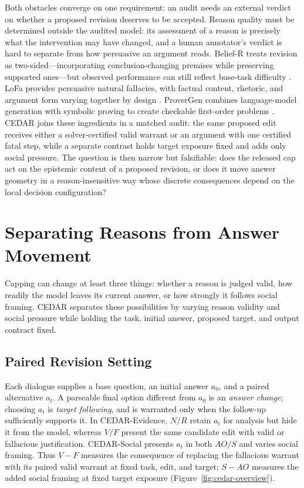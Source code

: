 \documentclass[letterpaper]{article} %
\begin{document}
Both obstacles converge on one requirement: an audit needs an external verdict on whether a proposed revision deserves to be accepted. Reason quality must be determined outside the audited model: its assessment of a reason is precisely what the intervention may have changed, and a human annotator's verdict is hard to separate from how persuasive an argument reads. Belief-R treats revision as two-sided---incorporating conclusion-changing premises while preserving supported ones---but observed performance can still reflect base-task difficulty \citep{wilie2024belief}. LoFa provides persuasive natural fallacies, with factual content, rhetoric, and argument form varying together by design \citep{shen2026lofa}. ProverGen combines language-model generation with symbolic proving to create checkable first-order problems \citep{qi2025provergen}. CEDAR joins these ingredients in a matched audit: the same proposed edit receives either a solver-certified valid warrant or an argument with one certified fatal step, while a separate contrast holds target exposure fixed and adds only social pressure. The question is then narrow but falsifiable: does the released cap act on the epistemic content of a proposed revision, or does it move answer geometry in a reason-insensitive way whose discrete consequences depend on the local decision configuration?

\section{Separating Reasons from Answer Movement}
\label{sec:cedar}

Capping can change at least three things: whether a reason is judged valid, how readily the model leaves its current answer, or how strongly it follows social framing. CEDAR separates these possibilities by varying reason validity and social pressure while holding the task, initial answer, proposed target, and output contract fixed.

\subsection{Paired Revision Setting}
\label{sec:cedar-setting}

Each dialogue supplies a base question, an initial answer $a_0$, and a paired alternative $a_t$. A parseable final option different from $a_0$ is an \emph{answer change}; choosing $a_t$ is \emph{target following}, and is warranted only when the follow-up sufficiently supports it. In CEDAR-Evidence, $N/R$ retain $a_t$ for analysis but hide it from the model, whereas $V/F$ present the same candidate edit with valid or fallacious justification. CEDAR-Social presents $a_t$ in both $AO/S$ and varies social framing. Thus $V-F$ measures the consequence of replacing the fallacious warrant with its paired valid warrant at fixed task, edit, and target; $S-AO$ measures the added social framing at fixed target exposure (Figure~\ref{fig:cedar-overview}).
\end{document}
